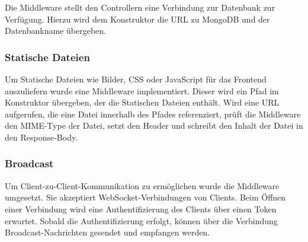 Die Middleware  stellt den Controllern eine Verbindung zur
Datenbank zur Verfügung.  Hierzu wird dem Konstruktor die URL zu MongoDB und
der Datenbankname übergeben.

\subsubsection{Statische Dateien}
\label{sssec:bam_statische_dateien}

Um Statische Dateien wie Bilder, CSS oder JavaScript für das Frontend
auszuliefern wurde eine Middleware  implementiert.  Dieser
wird ein Pfad im Konstruktor übergeben, der die Statischen Dateien enthält.
Wird eine URL aufgerufen, die eine Datei innerhalb des Pfades referenziert,
prüft die Middleware den MIME-Type der Datei, setzt den Header
 und schreibt den Inhalt der Datei in den Response-Body.

\subsubsection{Broadcast}
\label{sssec:bam_broadcast}

Um Client-zu-Client-Kommunikation zu ermöglichen wurde die Middleware
 umgesetzt.  Sie akzeptiert WebSocket-Verbindungen von Clients.
Beim Öffnen einer Verbindung wird eine Authentifizierung des Clients über einen
Token erwartet.  Sobald die Authentifizierung erfolgt, können über die
Verbindung Broadcast-Nachrichten gesendet und empfangen werden.
